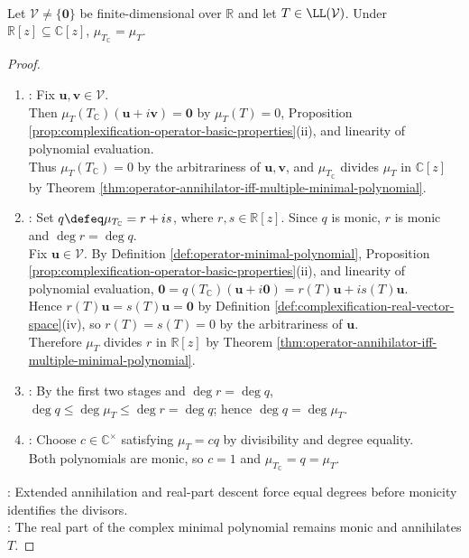 \begin{proposition} \label{prop:minimal-polynomial-complexification} \\
Let $\mathcal{V}\neq\{\mathbf{0}\}$ be finite-dimensional over $\mathbb{R}$ and let $T\in\LL(\mathcal{V})$. Under $\mathbb{R}[z]\subseteq\mathbb{C}[z]$, $\mu_{T_{\mathbb{C}}}=\mu_T$.
\begin{proof}
\begin{enumerate}[label=(\roman*)]
\setlength{\itemsep}{0pt}
\item {}: Fix $\mathbf{u},\mathbf{v}\in\mathcal{V}$.\\
Then $\mu_T(T_{\mathbb{C}})(\mathbf{u}+i\mathbf{v})=\mathbf{0}$ by $\mu_T(T)=0$, Proposition \ref{prop:complexification-operator-basic-properties}(ii), and linearity of polynomial evaluation.\\
Thus $\mu_T(T_{\mathbb{C}})=0$ by the arbitrariness of $\mathbf{u},\mathbf{v}$, and $\mu_{T_{\mathbb{C}}}$ divides $\mu_T$ in $\mathbb{C}[z]$ by Theorem \ref{thm:operator-annihilator-iff-multiple-minimal-polynomial}.
\item {}: Set $q\defeq\mu_{T_{\mathbb{C}}}=r+is$, where $r,s\in\mathbb{R}[z]$. Since $q$ is monic, $r$ is monic and $\deg r=\deg q$.\\
Fix $\mathbf{u}\in\mathcal{V}$. By Definition \ref{def:operator-minimal-polynomial}, Proposition \ref{prop:complexification-operator-basic-properties}(ii), and linearity of polynomial evaluation, $\mathbf{0}=q(T_{\mathbb{C}})(\mathbf{u}+i\mathbf{0})=r(T)\mathbf{u}+is(T)\mathbf{u}$.\\
Hence $r(T)\mathbf{u}=s(T)\mathbf{u}=\mathbf{0}$ by Definition \ref{def:complexification-real-vector-space}(iv), so $r(T)=s(T)=0$ by the arbitrariness of $\mathbf{u}$.\\
Therefore $\mu_T$ divides $r$ in $\mathbb{R}[z]$ by Theorem \ref{thm:operator-annihilator-iff-multiple-minimal-polynomial}.
\item {}: By the first two stages and $\deg r=\deg q$, $\deg q\leq\deg\mu_T\leq\deg r=\deg q$; hence $\deg q=\deg\mu_T$.
\item {}: Choose $c\in\mathbb{C}^{\times}$ satisfying $\mu_T=cq$ by divisibility and degree equality.\\
Both polynomials are monic, so $c=1$ and $\mu_{T_{\mathbb{C}}}=q=\mu_T$.
\end{enumerate}
: Extended annihilation and real-part descent force equal degrees before monicity identifies the divisors.\\
: The real part of the complex minimal polynomial remains monic and annihilates $T$.
\end{proof}
\end{proposition}
